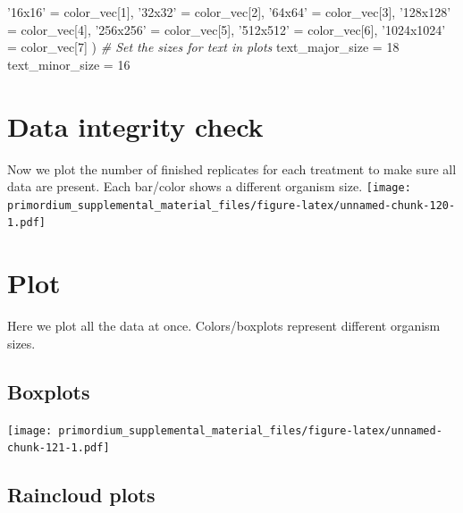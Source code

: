 \documentclass[]{book}
\newenvironment{Shaded}{\begin{snugshade}}{\end{snugshade}}
\newcommand{\CommentTok}[1]{\textcolor[rgb]{0.56,0.35,0.01}{\textit{#1}}}
\newcommand{\DecValTok}[1]{\textcolor[rgb]{0.00,0.00,0.81}{#1}}
\newcommand{\NormalTok}[1]{#1}
\newcommand{\StringTok}[1]{\textcolor[rgb]{0.31,0.60,0.02}{#1}}
\begin{document}
\begin{Shaded}
\begin{Highlighting}[]
  \StringTok{'16x16'}\NormalTok{ =}\StringTok{     }\NormalTok{color_vec[}\DecValTok{1}\NormalTok{],}
  \StringTok{'32x32'}\NormalTok{ =}\StringTok{     }\NormalTok{color_vec[}\DecValTok{2}\NormalTok{],}
  \StringTok{'64x64'}\NormalTok{ =}\StringTok{     }\NormalTok{color_vec[}\DecValTok{3}\NormalTok{],}
  \StringTok{'128x128'}\NormalTok{ =}\StringTok{   }\NormalTok{color_vec[}\DecValTok{4}\NormalTok{],}
  \StringTok{'256x256'}\NormalTok{ =}\StringTok{   }\NormalTok{color_vec[}\DecValTok{5}\NormalTok{],}
  \StringTok{'512x512'}\NormalTok{ =}\StringTok{   }\NormalTok{color_vec[}\DecValTok{6}\NormalTok{],}
  \StringTok{'1024x1024'}\NormalTok{ =}\StringTok{ }\NormalTok{color_vec[}\DecValTok{7}\NormalTok{]}
\NormalTok{)}
\CommentTok{# Set the sizes for text in plots}
\NormalTok{text_major_size =}\StringTok{ }\DecValTok{18}
\NormalTok{text_minor_size =}\StringTok{ }\DecValTok{16} 
\end{Highlighting}
\end{Shaded}

\hypertarget{data-integrity-check-7}{%
\section{Data integrity check}\label{data-integrity-check-7}}

Now we plot the number of finished replicates for each treatment to make sure all data are present.
Each bar/color shows a different organism size.
\texttt{[image: primordium\_supplemental\_material\_files/figure-latex/unnamed-chunk-120-1.pdf]}

\hypertarget{plot-2}{%
\section{Plot}\label{plot-2}}

Here we plot all the data at once.
Colors/boxplots represent different organism sizes.

\hypertarget{boxplots-1}{%
\subsection{Boxplots}\label{boxplots-1}}

\texttt{[image: primordium\_supplemental\_material\_files/figure-latex/unnamed-chunk-121-1.pdf]}

\hypertarget{raincloud-plots-1}{%
\subsection{Raincloud plots}\label{raincloud-plots-1}}
\end{document}
